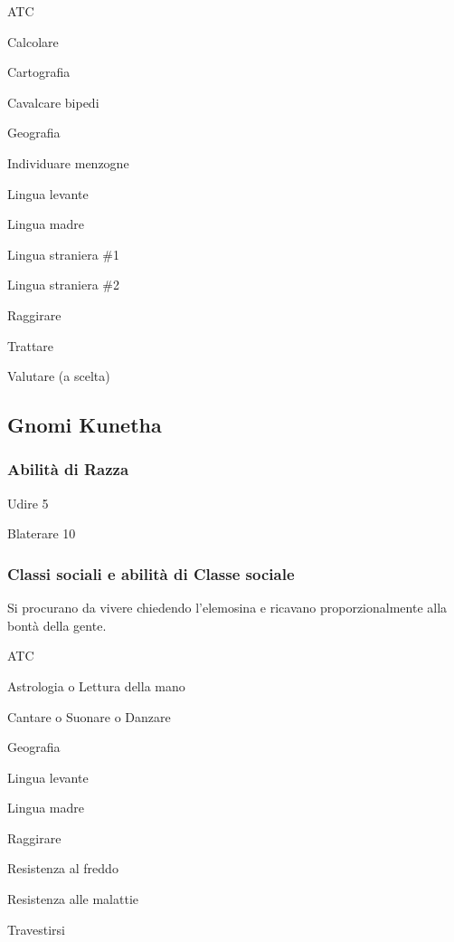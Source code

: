 \begin{abilist}
\item ATC
\item Calcolare
\item Cartografia
\item Cavalcare bipedi
\item Geografia
\item Individuare menzogne
\item Lingua levante
\item Lingua madre
\item Lingua straniera \#1
\item Lingua straniera \#2
\item Raggirare
\item Trattare
\item Valutare (a scelta)
\end{abilist}

\subsection{Gnomi Kunetha}

\minmaxgnomi

\subsubsection{Abilit\`a di Razza} 
\begin{abilist}
\item Udire 5
\item  Blaterare 10
\end{abilist}

\subsubsection{Classi sociali e abilit\`a di Classe sociale}


Si procurano da vivere chiedendo l'elemosina e ricavano
proporzionalmente alla bont\`a della gente.

\begin{abilist}
\item ATC
\item Astrologia o Lettura della mano
\item Cantare o Suonare o Danzare
\item Geografia
\item Lingua levante
\item Lingua madre
\item Raggirare
\item Resistenza al freddo
\item Resistenza alle malattie
\item Travestirsi
\end{abilist}

